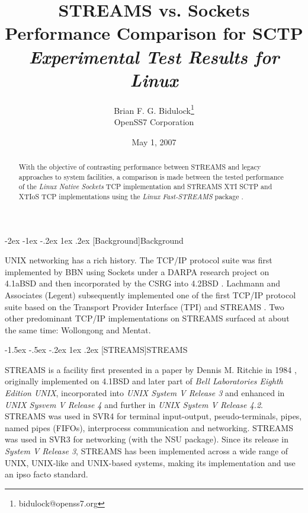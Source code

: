 \documentclass[letterpaper,final,notitlepage,twocolumn,10pt,twoside]{article}
\makeatletter
\renewcommand\section{\@startsection {section}{1}{\z@}%
                                   {-2ex \@plus -1ex \@minus -.2ex}%
                                   {1ex \@plus .2ex}%
                                   {\normalfont\large\bfseries}}
\renewcommand\subsection{\@startsection{subsection}{2}{\z@}%
                                     {-1.5ex \@plus -.5ex \@minus -.2ex}%
                                     {1ex \@plus .2ex}%
                                     {\normalfont\normalsize\bfseries}}
\makeatother
\begin{document}

\title{STREAMS vs. Sockets Performance Comparison for SCTP\\[0.5ex]
	{\large \textsl{Experimental Test Results for Linux}}}
\author{Brian F. G. Bidulock\thanks{bidulock@openss7.org}\\
	OpenSS7 Corporation}
\date{May 1, 2007}
\maketitle

\begin{abstract}
With the objective of contrasting performance between STREAMS and legacy approaches to system
facilities, a comparison is made between the tested performance of the \textsl{Linux Native Sockets}
TCP implementation and STREAMS XTI SCTP and XTIoS TCP implementations using the \textsl{Linux
Fast-STREAMS} package \cite[]{LfS}.
\end{abstract}


\section[Background]{Background}

UNIX networking has a rich history.  The TCP/IP protocol suite was first implemented by BBN using
Sockets under a DARPA research project on 4.1aBSD and then incorporated by the CSRG into 4.2BSD
\cite[]{bsd}.  Lachmann and Associates (Legent) subsequently implemented one of the first TCP/IP
protocol suite based on the Transport Provider Interface (TPI) \cite[]{tli} and STREAMS
\cite[]{magic}.  Two other predominant TCP/IP implementations on STREAMS surfaced at about the same
time: Wollongong and Mentat.

\subsection[STREAMS]{STREAMS}

STREAMS is a facility first presented in a paper by Dennis M. Ritchie in 1984 \cite[]{Ritchie84},
originally implemented on 4.1BSD and later part of \textsl{Bell Laboratories Eighth Edition UNIX},
incorporated into \textsl{UNIX System V Release 3} and enhanced in \textsl{UNIX Sysvem V Release 4}
and further in \textsl{UNIX System V Release 4.2}.  STREAMS was used in SVR4 for terminal
input-output, pseudo-terminals, pipes, named pipes (FIFOs), interprocess communication and
networking.  STREAMS was used in SVR3 for networking (with the NSU package).  Since its release in
\textsl{System V Release 3}, STREAMS has been implemented across a wide range of UNIX, UNIX-like and
UNIX-based systems, making its implementation and use an ipso facto standard.
\end{document}

